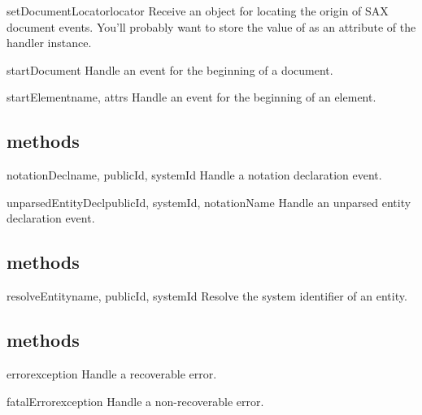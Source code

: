 \documentclass{howto}
\begin{document}
\begin{methoddesc}{setDocumentLocator}{locator}
Receive an object for locating the origin of SAX document events.
You'll probably want to store the value of  as an
attribute of the handler instance.
\end{methoddesc}

\begin{methoddesc}{startDocument}{}
Handle an event for the beginning of a document.
\end{methoddesc}

\begin{methoddesc}{startElement}{name, attrs}
Handle an event for the beginning of an element.
\end{methoddesc}


\subsection{ methods}

\begin{methoddesc}{notationDecl}{name, publicId, systemId}
Handle a notation declaration event.
\end{methoddesc}

\begin{methoddesc}{unparsedEntityDecl}{publicId, systemId, notationName}
Handle an unparsed entity declaration event.
\end{methoddesc}


\subsection{ methods}

\begin{methoddesc}{resolveEntity}{name, publicId, systemId}
Resolve the system identifier of an entity.
\end{methoddesc}

\subsection{ methods}

\begin{methoddesc}{error}{exception}
Handle a recoverable error.
\end{methoddesc}

\begin{methoddesc}{fatalError}{exception}
Handle a non-recoverable error.
\end{methoddesc}
\end{document}
